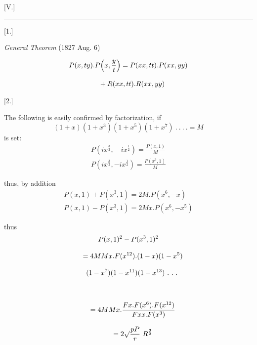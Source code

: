 \begingroup
\renewcommand{\arraystretch}{1.45}
\clearpage{}


\begin{center}[V.]\par\rule{.10\linewidth}{.3pt}\end{center}


\begin{center}[1.]\par\emph{General Theorem} (1827 Aug. 6)\end{center}
\[
\begin{gathered}P(x,ty).P\Bigl(x,\frac yt\Bigr)=P(xx,tt).P(xx,yy)\\[8pt]\quad{}+R(xx,tt).R(xx,yy)\end{gathered}
\]

\par\medskip{}\centerline{[2.]}\nobreak\smallskip
The following is easily confirmed by factorization, if
\[
(1+x)(1+x^3)(1+x^5)(1+x^7)\ .\ .\ .\ .=M
\]
is set:
\[
\begin{gathered}
P(ix^{\frac32},\quad ix^{\frac12})=\frac{P(x,1)}{M}\\[8pt]
P(ix^{\frac32},-ix^{\frac12})=\frac{P(x^3,1)}{M}
\end{gathered}
\]

thus, by addition
\[
\begin{gathered}
P(x,1)+P(x^3,1)=2M.P(x^6,-x)\\[8pt]
P(x,1)-P(x^3,1)=2Mx.P(x^6,-x^5)
\end{gathered}
\]

thus
\[
\begin{gathered}
P(x,1)^2-P(x^3,1)^2
\\[8pt]\quad{}=4MMx.F(x^{12}).(1-x)(1-x^5)\\[8pt]\quad{}(1-x^7)(1-x^{11})(1-x^{13})\ .\ .\ .\\[8pt]
\\[8pt]\quad{}=4MMx.\frac{Fx.F(x^6).F(x^{12})}{Fxx.F(x^3)}
\\[8pt]\quad{}=2\surd\frac{pP}{r}\ R^{\frac32}
\end{gathered}
\]



